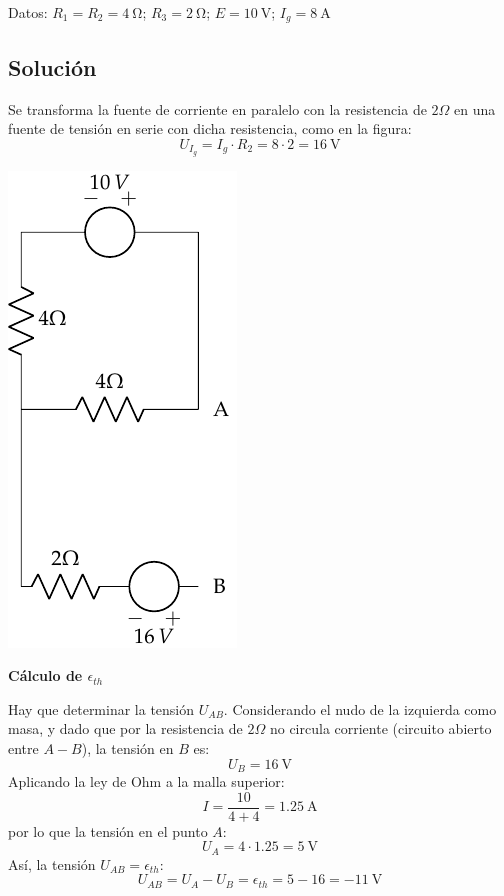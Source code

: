 Datos: $R_1 = R_2 = \qty{4}{\ohm}$; $R_3 = \qty{2}{\ohm}$; $E = \qty{10}{\volt}$; $I_g = \qty{8}{\ampere}$

\subsection*{Solución}
Se transforma la fuente de corriente en paralelo con la resistencia de
$2\Omega$ en una fuente de tensión en serie con dicha resistencia,
como en la figura:
\begin{equation*}
  U_{I_g}=I_g\cdot R_2=8\cdot 2=\qty{16}{\volt}
\end{equation*}

\begin{center}
  \includegraphics{figuras/BT1_17_mallas.pdf}
\end{center}


\textbf{Cálculo de $\epsilon_{th}$}

Hay que determinar la tensión $U_{AB}$. Considerando el nudo de la
izquierda como masa, y dado que por la resistencia de $2\Omega$ no
circula corriente (circuito abierto entre $A-B$), la tensión en $B$
es:
\begin{equation*}
  U_B=\qty{16}{\volt}
\end{equation*}
Aplicando la ley de Ohm a la malla superior:
\begin{equation*}
  I=\dfrac{10}{4+4}=\qty{1.25}{\ampere}
\end{equation*}
por lo que la tensión en el punto $A$:
\begin{equation*}
  U_A=4\cdot 1.25=\qty{5}{\volt}
\end{equation*}
Así, la tensión $U_{AB}=\epsilon_{th}$:
\begin{equation*}
  U_{AB}=U_A-U_B=\epsilon_{th}=5-16=\qty{-11}{\volt}
\end{equation*}

